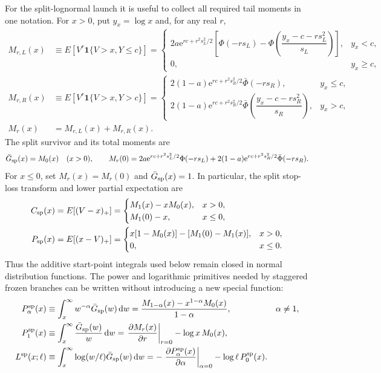 \documentclass[12pt]{article}
\newcommand{\dd}{\,\mathrm{d}}
\newcommand{\PhiN}{\Phi}
\newcommand{\Phibar}{\bar{\Phi}}
\newcommand{\Gbar}{\bar{G}}
\newcommand{\e}{\mathrm{e}}
\theoremstyle{remark}
\begin{document}
For the split-lognormal launch it is useful to collect all required tail moments in one notation. For $x>0$, put $y_x=\log x$ and, for any real $r$,
\begin{align}
 M_{r,L}(x) &\equiv E\!\left[V^r\mathbf{1}\{V>x,Y\le c\}\right]
 =\begin{cases}
  2a\e^{rc+r^2s_L^2/2}
  \left[\PhiN(-rs_L)-
  \PhiN\!\left(\dfrac{y_x-c-rs_L^2}{s_L}\right)\right],&y_x<c,\\[6pt]
  0,&y_x\ge c,
 \end{cases} \\
 M_{r,R}(x) &\equiv E\!\left[V^r\mathbf{1}\{V>x,Y>c\}\right]
 =\begin{cases}
  2(1-a)\e^{rc+r^2s_R^2/2}\Phibar(-rs_R),&y_x\le c,\\[6pt]
  2(1-a)\e^{rc+r^2s_R^2/2}
  \Phibar\!\left(\dfrac{y_x-c-rs_R^2}{s_R}\right),&y_x>c,
 \end{cases} \\
 M_r(x) &= M_{r,L}(x)+M_{r,R}(x).
 \label{eq:split-tail-moments}
\end{align}
The split survivor and its total moments are
\begin{equation}
  \Gbar_{\rm sp}(x)=M_0(x)\quad(x>0),\qquad
  M_r(0)=2a\e^{rc+r^2s_L^2/2}\PhiN(-rs_L)
       +2(1-a)\e^{rc+r^2s_R^2/2}\Phibar(-rs_R).
  \label{eq:split-survivor-moment}
\end{equation}
For $x\le0$, set $M_r(x)=M_r(0)$ and $\Gbar_{\rm sp}(x)=1$. In particular, the split stop-loss transform and lower partial expectation are
\begin{align}
 C_{\rm sp}(x)&=E[(V-x)_+]
 =\begin{cases}M_1(x)-xM_0(x),&x>0,\\ M_1(0)-x,&x\le0,\end{cases}
 \label{eq:split-stoploss}\\
 P_{\rm sp}(x)&=E[(x-V)_+]
 =\begin{cases}x[1-M_0(x)]-[M_1(0)-M_1(x)],&x>0,\\ 0,&x\le0.
 \end{cases}
 \label{eq:split-put}
\end{align}
Thus the additive start-point integrals used below remain closed in normal distribution functions. The power and logarithmic primitives needed by staggered frozen branches can be written without introducing a new special function:
\begin{align}
 P_\alpha^{\rm sp}(x)
   &\equiv \int_x^\infty w^{-\alpha}\Gbar_{\rm sp}(w)\dd w
    =\frac{M_{1-\alpha}(x)-x^{1-\alpha}M_0(x)}{1-\alpha},
    &&\alpha\ne1,\\
 P_1^{\rm sp}(x)
   &\equiv \int_x^\infty \frac{\Gbar_{\rm sp}(w)}{w}\dd w
    =\left.\frac{\partial M_r(x)}{\partial r}\right|_{r=0}
       -\log x\,M_0(x),\\
 L^{\rm sp}(x;\ell)
   &\equiv \int_x^\infty\log(w/\ell)\Gbar_{\rm sp}(w)\dd w
    =-\left.\frac{\partial P_\alpha^{\rm sp}(x)}{\partial\alpha}\right|_{\alpha=0}
       -\log\ell\,P_0^{\rm sp}(x).
 \label{eq:split-power-primitives}
\end{align}
\end{document}
